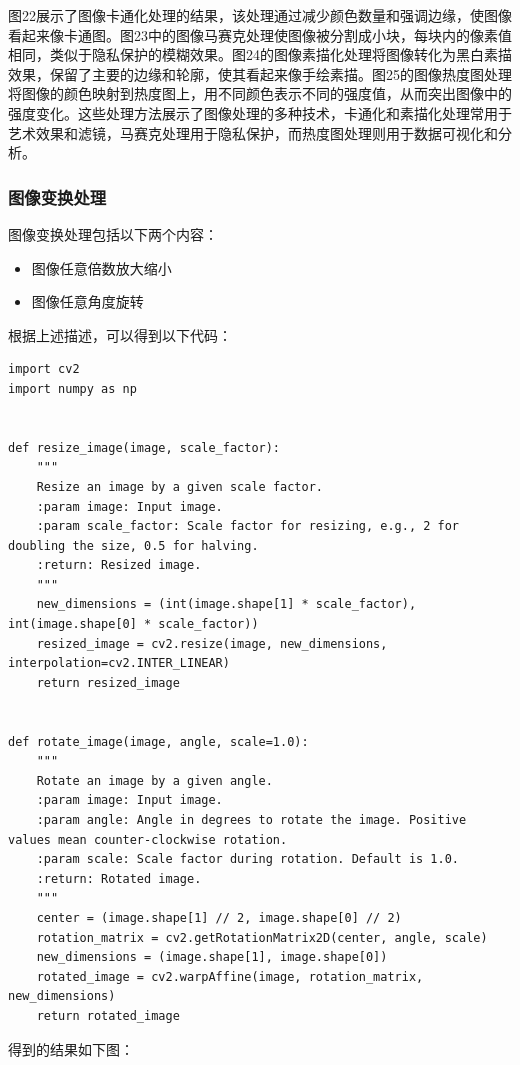 \documentclass[a4paper,12pt]{article}
\begin{document}
图22展示了图像卡通化处理的结果，该处理通过减少颜色数量和强调边缘，使图像看起来像卡通图。图23中的图像马赛克处理使图像被分割成小块，每块内的像素值相同，类似于隐私保护的模糊效果。图24的图像素描化处理将图像转化为黑白素描效果，保留了主要的边缘和轮廓，使其看起来像手绘素描。图25的图像热度图处理将图像的颜色映射到热度图上，用不同颜色表示不同的强度值，从而突出图像中的强度变化。这些处理方法展示了图像处理的多种技术，卡通化和素描化处理常用于艺术效果和滤镜，马赛克处理用于隐私保护，而热度图处理则用于数据可视化和分析。

\clearpage
\subsubsection{图像变换处理}
图像变换处理包括以下两个内容：
\begin{itemize}
    \item 图像任意倍数放大缩小
    \item 图像任意角度旋转
\end{itemize}
根据上述描述，可以得到以下代码：
\begin{lstlisting}[style=python]
import cv2
import numpy as np


def resize_image(image, scale_factor):
    """
    Resize an image by a given scale factor.
    :param image: Input image.
    :param scale_factor: Scale factor for resizing, e.g., 2 for doubling the size, 0.5 for halving.
    :return: Resized image.
    """
    new_dimensions = (int(image.shape[1] * scale_factor), int(image.shape[0] * scale_factor))
    resized_image = cv2.resize(image, new_dimensions, interpolation=cv2.INTER_LINEAR)
    return resized_image


def rotate_image(image, angle, scale=1.0):
    """
    Rotate an image by a given angle.
    :param image: Input image.
    :param angle: Angle in degrees to rotate the image. Positive values mean counter-clockwise rotation.
    :param scale: Scale factor during rotation. Default is 1.0.
    :return: Rotated image.
    """
    center = (image.shape[1] // 2, image.shape[0] // 2)
    rotation_matrix = cv2.getRotationMatrix2D(center, angle, scale)
    new_dimensions = (image.shape[1], image.shape[0])
    rotated_image = cv2.warpAffine(image, rotation_matrix, new_dimensions)
    return rotated_image

\end{lstlisting}
得到的结果如下图：
\end{document}
